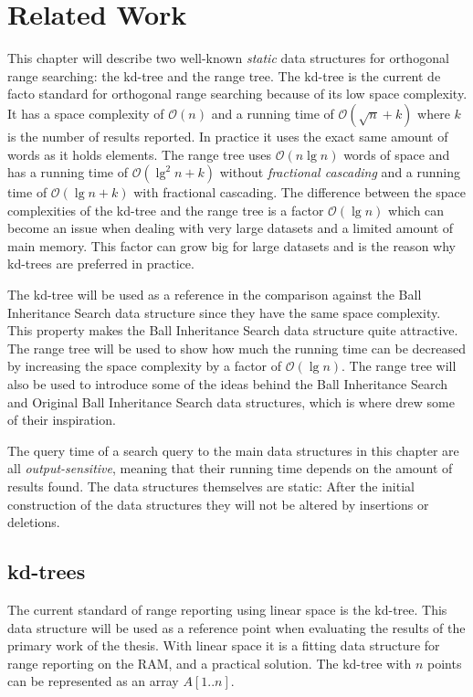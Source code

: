 \chapter{Related Work}
\label{ch:relatedwork}

This chapter will describe two well-known \emph{static} data structures for orthogonal range searching: the kd-tree and the range tree. The kd-tree is the current de facto standard for orthogonal range searching because of its low space complexity. It has a space complexity of $\mathcal{O}(n)$ and a running time of $\mathcal{O}(\sqrt{n} + k)$ where $k$ is the number of results reported. In practice it uses the exact same amount of words as it holds elements\cite{compgeo}. The range tree uses $\mathcal{O}(n \lg n)$ words of space and has a running time of $\mathcal{O}(\lg^2 n + k)$ without \emph{fractional cascading} and a running time of $\mathcal{O}(\lg n + k)$ with fractional cascading. The difference between the space complexities of the kd-tree and the range tree is a factor $\mathcal{O}(\lg n)$ which can become an issue when dealing with very large datasets and a limited amount of main memory. This factor can grow big for large datasets and is the reason why kd-trees are preferred in practice.

The kd-tree will be used as a reference in the comparison against the Ball Inheritance Search data structure since they have the same space complexity. This property makes the Ball Inheritance Search data structure quite attractive. The range tree will be used to show how much the running time can be decreased by increasing the space complexity by a factor of $\mathcal{O}(\lg n)$. The range tree will also be used to introduce some of the ideas behind the Ball Inheritance Search and Original Ball Inheritance Search data structures, which is where \citet{chanetal} drew some of their inspiration.

The query time of a search query to the main data structures in this chapter are all \emph{output-sensitive}, meaning that their running time depends on the amount of results found. The data structures themselves are static: After the initial construction of the data structures they will not be altered by insertions or deletions.

\section{kd-trees}
\label{sect:kdtrees}

The current standard of range reporting using linear space is the kd-tree. This data structure will be used as a reference point when evaluating the results of the primary work of the thesis. With linear space it is a fitting data structure for range reporting on the RAM, and a practical solution. The kd-tree with $n$ points can be represented as an array $A[1..n]$.

